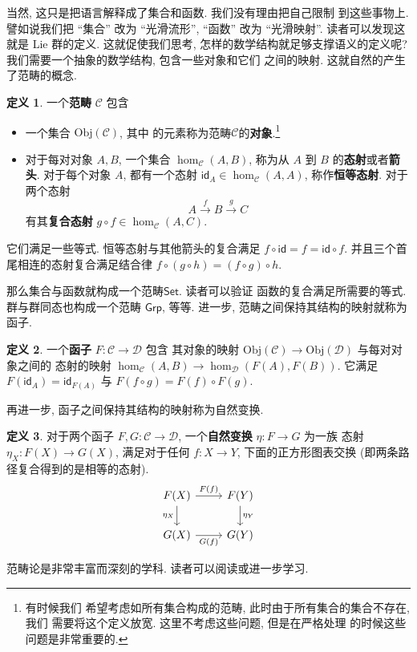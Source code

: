 \documentclass[UTF8]{ctexbook}
\newcommand{\cons}[1]{\textsf{#1}}
\theoremstyle{plain}
\theoremstyle{definition}
\newtheorem{definition}{定义}[chapter]
\theoremstyle{remark}
\begin{document}
当然, 这只是把语言解释成了集合和函数. 我们没有理由把自己限制
到这些事物上. 譬如说我们把 “集合” 改为 “光滑流形”,
“函数” 改为 “光滑映射”. 读者可以发现这就是 Lie 群的定义.
这就促使我们思考, 怎样的数学结构就足够支撑语义的定义呢?
我们需要一个抽象的数学结构, 包含一些对象和它们
之间的映射. 这就自然的产生了范畴的概念.
\begin{definition}
一个\textbf{范畴} \(\mathcal C\) 包含
\begin{itemize}
\item 一个集合 \(\mathrm{Obj}(\mathcal C)\), 其中
的元素称为范畴\(\mathcal C\)的\textbf{对象}.\footnote{有时候我们
希望考虑如所有集合构成的范畴, 此时由于所有集合的集合不存在, 我们
需要将这个定义放宽. 这里不考虑这些问题, 但是在严格处理
的时候这些问题是非常重要的.}
\item 对于每对对象 \(A,B\), 一个集合 \(\hom_{\mathcal C}(A,B)\),
称为从 \(A\) 到 \(B\) 的\textbf{态射}或者\textbf{箭头}.
对于每个对象 \(A\), 都有一个态射
\(\cons{id}_A \in \hom_{\mathcal C}(A,A)\), 称作\textbf{恒等态射}. 对于两个态射
\[A \xrightarrow f B \xrightarrow g C\]
有其\textbf{复合态射} \(g\circ f \in \hom_{\mathcal C}(A, C)\).
\end{itemize}
它们满足一些等式. 恒等态射与其他箭头的复合满足
\(f \circ \cons{id} = f = \cons{id} \circ f.\)
并且三个首尾相连的态射复合满足结合律
\(f\circ (g\circ h) = (f\circ g)\circ h.\)
\end{definition}

那么集合与函数就构成一个范畴\(\cons{Set}\). 读者可以验证
函数的复合满足所需要的等式. 群与群同态也构成一个范畴 \(\cons{Grp}\),
等等. 进一步, 范畴之间保持其结构的映射就称为函子.
\begin{definition}
一个\textbf{函子} \(F : \mathcal C \to \mathcal D\) 包含
其对象的映射 \(\mathrm{Obj}(\mathcal C)
\to \mathrm{Obj}(\mathcal D)\) 与每对对象之间的
态射的映射 \(\hom_{\mathcal C}(A,B) \to \hom_{\mathcal D}(F(A), F(B))\).
它满足 \(F(\cons{id}_A) = \cons{id}_{F(A)}\) 与
\(F(f \circ g) = F(f)\circ F(g)\).
\end{definition}
再进一步, 函子之间保持其结构的映射称为自然变换.
\begin{definition}
对于两个函子 \(F,G : \mathcal C \to\mathcal D\),
一个\textbf{自然变换} \(\eta : F \to G\) 为一族
态射 \(\eta_X : F(X) \to G(X)\), 满足对于任何
\(f : X \to Y\), 下面的正方形图表交换 (即两条路径复合得到的是相等的态射).
\[\begin{tikzcd}
{F(X)} & {F(Y)} \\
{G(X)} & {G(Y)}
\arrow["{\eta_X}"', from=1-1, to=2-1]
\arrow["{\eta_Y}", from=1-2, to=2-2]
\arrow["{F(f)}", from=1-1, to=1-2]
\arrow["{G(f)}"', from=2-1, to=2-2]
\end{tikzcd}\]
\end{definition}
范畴论是非常丰富而深刻的学科.
读者可以阅读\cite{smith:2018:category}或\cite{maclane:1971:category}进一步学习.
\end{document}
